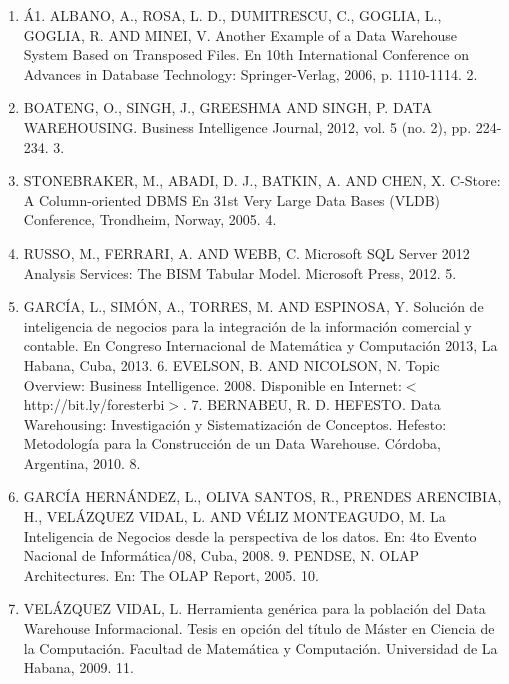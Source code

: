 \documentclass{article} %
\begin{document}
\noindent 

\begin{enumerate}
\item  \'{A}1.  ALBANO, A., ROSA, L. D., DUMITRESCU, C., GOGLIA, L., GOGLIA, R.  AND MINEI, V. Another Example of a Data Warehouse System Based on Transposed Files. En 10th International Conference on Advances in Database Technology: Springer-Verlag, 2006, p. 1110-1114. 2.  

\item  BOATENG, O., SINGH, J., GREESHMA AND SINGH, P. DATA WAREHOUSING. Business Intelligence Journal, 2012, vol. 5 (no. 2), pp. 224-234. 3.  

\item  STONEBRAKER, M., ABADI, D. J., BATKIN, A. AND CHEN, X.  C-Store: A Column-oriented DBMS En 31st Very Large Data Bases (VLDB) Conference, Trondheim, Norway, 2005. 4.

\item  RUSSO, M., FERRARI, A.  AND WEBB, C. Microsoft SQL Server 2012 Analysis Services: The BISM Tabular Model. Microsoft Press, 2012. 5.  

\item  GARC\'{I}A, L., SIM\'{O}N, A., TORRES, M. AND ESPINOSA, Y. Soluci\'{o}n de inteligencia de negocios para la integraci\'{o}n de la informaci\'{o}n comercial y contable.  En Congreso Internacional de Matem\'{a}tica y Computaci\'{o}n 2013, La Habana, Cuba, 2013. 6.  EVELSON, B. AND NICOLSON, N. Topic Overview: Business Intelligence.  2008. Disponible en Internet:$\mathrm{<}$http://bit.ly/foresterbi$\mathrm{>}$.  7.  BERNABEU, R. D. HEFESTO. Data Warehousing: Investigaci\'{o}n y Sistematizaci\'{o}n de Conceptos. Hefesto: Metodolog\'{i}a para la Construcci\'{o}n de un Data Warehouse. C\'{o}rdoba, Argentina, 2010. 8.  

\item  GARC\'{I}A HERN\'{A}NDEZ, L., OLIVA SANTOS, R., PRENDES ARENCIBIA, H., VEL\'{A}ZQUEZ VIDAL, L. AND V\'{E}LIZ MONTEAGUDO, M. La Inteligencia de Negocios desde la perspectiva de los datos. En: 4to Evento Nacional de Inform\'{a}tica/08, Cuba, 2008. 9.  PENDSE, N. OLAP Architectures. En: The OLAP Report, 2005. 10.  

\item  VEL\'{A}ZQUEZ VIDAL, L.  Herramienta    gen\'{e}rica para la poblaci\'{o}n del Data Warehouse Informacional. Tesis en opci\'{o}n del t\'{i}tulo de M\'{a}ster en Ciencia de la Computaci\'{o}n. Facultad de Matem\'{a}tica y Computaci\'{o}n. Universidad de La Habana, 2009. 11.  
\end{enumerate}

\noindent \textbf{}
\end{document}

